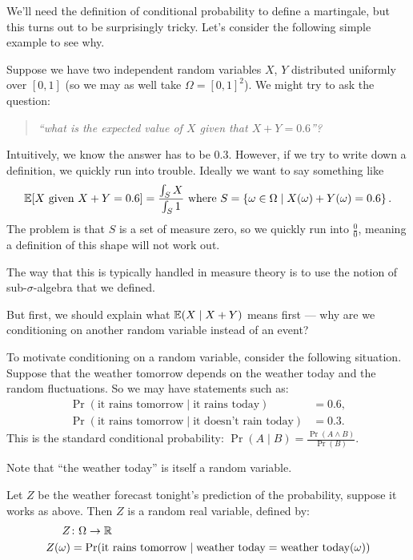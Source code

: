 We'll need the definition of conditional probability to define a martingale,
but this turns out to be surprisingly tricky.
Let's consider the following simple example to see why.
\begin{example}
	Suppose we have two independent random variables $X$, $Y$ distributed
	uniformly over $[0,1]$ (so we may as well take $\Omega = [0,1]^2$).
	We might try to ask the question:
	\begin{quote}
		\itshape
		``what is the expected value of $X$
		given that $X+Y = 0.6$''?
	\end{quote}
	Intuitively, we know the answer has to be $0.3$.
	However, if we try to write down a definition, we quickly run into trouble.
	Ideally we want to say something like
	\[ \mathbb E[X \text{ given } X+Y=0.6]
		= \frac{\int_{S} X}{\int_{S} 1}
		\text{ where }
		S = \left\{ \omega \in \Omega \mid X(\omega)+Y(\omega)=0.6 \right\}.  \]
	The problem is that $S$ is a set of measure zero,
	so we quickly run into $\frac 00$, meaning a definition
	of this shape will not work out.
\end{example}

The way that this is typically handled in measure theory
is to use the notion of sub-$\sigma$-algebra that we defined.

But first, we should explain what $\mathbb E(X \mid X+Y)$ means first --- why are we conditioning on
another random variable instead of an event?

To motivate conditioning on a random variable, consider the following situation.
Suppose that the weather tomorrow depends on the weather today and the random fluctuations.
So we may have statements such as:
\begin{align*}
	\Pr(\text{it rains tomorrow}\mid \text{it rains today}) &= 0.6, \\
	\Pr(\text{it rains tomorrow}\mid \text{it doesn't rain today}) &= 0.3.
\end{align*}
This is the standard conditional probability: $\Pr(A \mid B) = \frac{\Pr(A \wedge B)}{\Pr(B)}$.

Note that ``the weather today'' is itself a random variable.

Let $Z$ be the weather forecast tonight's prediction of the probability, suppose it works as above.
Then $Z$ is a random real variable, defined by:
\begin{align*}
	Z &\colon \Omega \to \mathbb R \\
	Z(\omega) &= \Pr(\text{it rains tomorrow}
			\mid \text{weather today} = \text{weather today}(\omega))
\end{align*}

